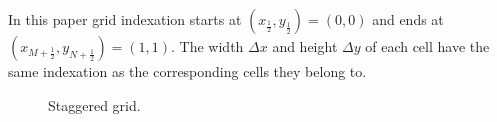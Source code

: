 \documentclass{article}
\numberwithin{equation}{section}
\begin{document}
In this paper grid indexation starts at $(x_{\frac{1}{2}},y_{\frac{1}{2}})=(0,0)$ and ends at $(x_{M+\frac{1}{2}},y_{N+\frac{1}{2}})=(1,1)$. 
	The width $\Delta x$ and height $\Delta y$ of each cell have the same indexation as the corresponding cells they belong to. 

\begin{figure}[H]
\centering
\caption{\small Staggered grid.}
\end{figure}
\end{document}
